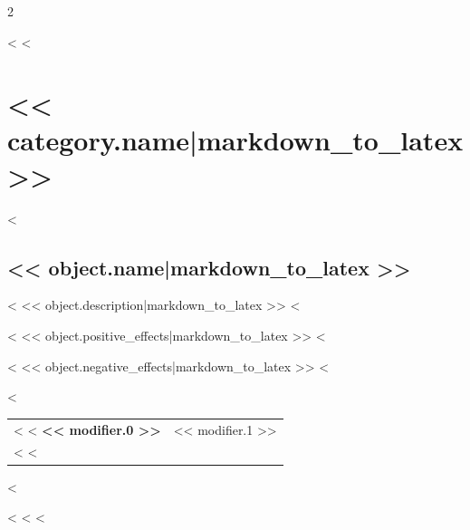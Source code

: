 \label{ch:appendix-quirks}

\begin{multicols}{2}

    <%
    <%
    \section{<< category.name|markdown_to_latex >>}

    <%
    \subsection*{<< object.name|markdown_to_latex >>}

    <%
    << object.description|markdown_to_latex >>
    <%

    <%
    << object.positive_effects|markdown_to_latex >>
    <%

    <%
    << object.negative_effects|markdown_to_latex >>
    <%

    <%
    \begin{tabular}{@{}ll@{}}
        <%
        <%
        \textbf{<< modifier.0 >>} & << modifier.1 >>\\
        <%
        <%
    \end{tabular}
    <%

    <%
    <%
    <%
\end{multicols}
